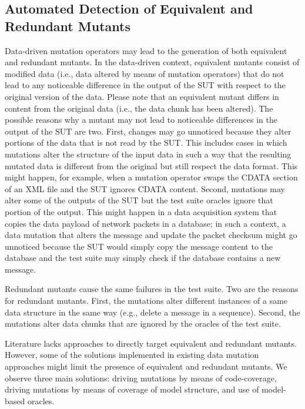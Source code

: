 
\subsection{Automated Detection of Equivalent and Redundant Mutants}
\label{sec:dataequivalent}

Data-driven mutation operators may lead to the generation of both equivalent and redundant mutants.
In the data-driven context, equivalent mutants consist of modified data (i.e., data altered by means of mutation operators) that do not lead to any noticeable difference in the output of the SUT with respect to the original version of the data.
Please note that an equivalent mutant differs in content from the original data (i.e., the data chunk has been altered).
The possible reasons why a mutant may not lead to noticeable differences in the output of the SUT are two. First, changes may go unnoticed because they alter portions of the data that is not read by the SUT. This includes cases in which mutations alter the structure of the input data in such a way that the resulting mutated data is different from the original but still respect the data format. This might happen, for example, when a mutation operator swaps the CDATA section of an XML file and the SUT ignores CDATA content. Second, mutations may alter some of the outputs of the SUT but the test suite oracles ignore that portion of the output. This might happen in a data acquisition system that copies the data payload of network packets in a database; in such a context, a data mutation that alters the message and update the packet checksum might go unnoticed because the SUT would simply copy the message content to the database and the test suite may simply check if the database contains a new message.

Redundant mutants cause the same failures in the test suite. Two are the reasons for redundant mutants. First, the mutations alter different instances of a same data structure in the same way (e.g., delete a message in a sequence). Second, the mutations alter data chunks that are ignored by the oracles of the test suite.

Literature lacks approaches to directly target equivalent and redundant mutants. However, some of the solutions implemented in existing data mutation approaches might limit the presence of equivalent and redundant mutants. We observe three main solutions: driving mutations by means of code-coverage, driving mutations by means of coverage of model structure, and use of model-based oracles.

